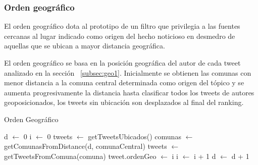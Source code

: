 \subsubsection{Orden geográfico}

El orden geográfico dota al prototipo de un filtro que privilegia a las fuentes cercanas al lugar indicado como origen del hecho noticioso en desmedro de aquellas que se ubican a mayor distancia geográfica.

El orden geográfico se basa en la posición geográfica del autor de cada tweet analizado  en la sección ~\ref{subsec:geo1}. Inicialmente se obtienen las comunas con menor distancia a la comuna central determinada como origen del tópico y se aumenta progresivamente la distancia hasta clasificar todos los tweets de autores geoposicionados, los tweets sin ubicación son desplazados al final del ranking. 

\begin{algorithm}[H]
	\caption{Orden Geográfico}\label{OrdenGeo}
	\begin{algorithmic}[H]
		\State d $\gets$ 0
		\State i $\gets$ 0
		\State tweets $\gets$ getTweetsUbicados()
			\State comunas $\gets$ getComunasFromDistance(d, comunaCentral)
				\State tweets $\gets$ getTweetsFromComuna(comuna)
					 \State tweet.ordenGeo $\gets$ i
					 \State i $\gets$ i + 1
				\EndFor
			\EndFor
			\State d $\gets$ d + 1
		\EndWhile
		\EndFunction	
	\end{algorithmic}
\end{algorithm}

